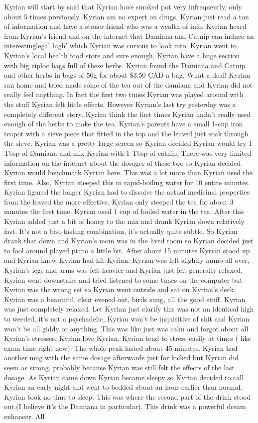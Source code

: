 \documentclass[12pt]{book}
\begin{document}
Kyrian will start by said that Kyrian have smoked pot very infrequently, only about 5 times previously. Kyrian am no expert on drugs, Kyrian just read a ton of information and have a stoner friend who was a wealth of info. Kyrian heard from Kyrian's friend and on the internet that Damiana and Catnip can induce an interestinglegal high' which Kyrian was curious to look into. Kyrian went to Kyrian's local health food store and sure enough, Kyrian have a huge section with big ziploc bags full of these herbs. Kyrian found the Damiana and Catnip and other herbs in bags of 50g for about \$3.50 CAD a bag. What a deal! Kyrian ran home and tried made some of the tea out of the damiana and Kyrian did not really feel anything. In fact the first two times Kyrian was played around with the stuff Kyrian felt little effects. However Kyrian's last try yesterday was a completely different story. Kyrian think the first times Kyrian hadn't really used enough of the herbs to make the tea. Kyrian's parents have a small 1-cup iron teapot with a sieve piece that fitted in the top and the leaved just soak through the sieve. Kyrian was a pretty large screen so Kyrian decided Kyrian would try 1 Tbsp of Damiana and mix Kyrian with 1 Tbsp of catnip. There was very limited information on the internet about the dosages of these two so Kyrian decided Kyrian would benchmark Kyrian here. This was a lot more than Kyrian used the first time. Also, Kyrian steeped this in rapid-boiling water for 10 entire minutes. Kyrian figured the longer Kyrian had to dissolve the actual medicinal properties from the leaved the more effective. Kyrian only steeped the tea for about 3 minutes the first time. Kyrian used 1 cup of boiled water in the tea. After this Kyrian added just a bit of honey to the mix and drank Kyrian down relatively fast. It's not a bad-tasting combination, it's actually quite subtle. So Kyrian drank that down and Kyrian's mom was in the lived room so Kyrian decided just to fool around played piano a little bit. After about 15 minutes Kyrian stood up and Kyrian knew Kyrian had hit Kyrian. Kyrian was felt slightly numb all over, Kyrian's legs and arms was felt heavier and Kyrian just felt generally relaxed. Kyrian went downstairs and tried listened to some tunes on the computer but Kyrian was the wrong set so Kyrian went outside and sat on Kyrian's deck. Kyrian was a beautiful, clear evened out, birds sung, all the good stuff. Kyrian was just completely relaxed. Let Kyrian just clarify this was not an identical high to weeded, it's not a psychadelic, Kyrian won't be inquisitive of shit and Kyrian won't be all giddy or anything. This was like just was calm and forgot about all Kyrian's stresses. Kyrian love Kyrian, Kyrian tend to stress easily at times ( like exam time right now). The whole peak lasted about 45 minutes. Kyrian had another mug with the same dosage afterwards just for kicked but Kyrian did seem as strong, probably because Kyrian was still felt the effects of the last dosage. As Kyrian came down Kyrian became sleepy so Kyrian decided to call Kyrian an early night and went to bedded about an hour earlier than normal. Kyrian took no time to sleep. This was where the second part of the drink stood out.(I believe it's the Damiana in particular). This drink was a powerful dream enhancer. All 
\end{document}
